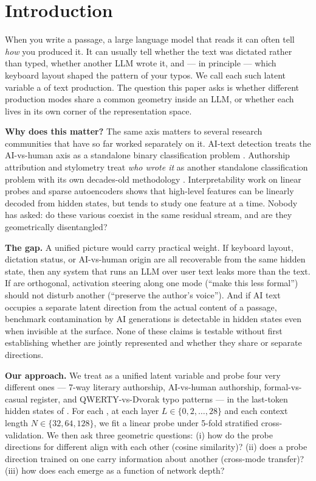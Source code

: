 \section{Introduction}
\label{sec:intro}

When you write a passage, a large language model that reads it can often tell \emph{how} you produced it. It can usually tell whether the text was dictated rather than typed, whether another LLM wrote it, and --- in principle --- which keyboard layout shaped the pattern of your typos. We call each such latent variable a \modes of text production. The question this paper asks is whether different production modes share a common geometry inside an LLM, or whether each lives in its own corner of the representation space.

{\bf Why does this matter?} The same axis matters to several research communities that have so far worked separately on it. AI-text detection treats the AI-vs-human axis as a standalone binary classification problem \citep{mitchell2023detectgpt,verma2023ghostbuster,schafer2025stylistic}. Authorship attribution and stylometry treat \emph{who wrote it} as another standalone classification problem with its own decades-old methodology \citep{rivera2021universal,sarfati2025prompt}. Interpretability work on linear probes and sparse autoencoders \citep{alain2016linear,templeton2024scaling} shows that high-level features can be linearly decoded from hidden states, but tends to study one feature at a time. Nobody has asked: do these various \modes coexist in the same residual stream, and are they geometrically disentangled?

{\bf The gap.} A unified picture would carry practical weight. If keyboard layout, dictation status, or AI-vs-human origin are all recoverable from the same hidden state, then any system that runs an LLM over user text leaks more than the text. If \modes are orthogonal, activation steering along one mode (\eg ``make this less formal'') should not disturb another (``preserve the author's voice''). And if AI text occupies a separate latent direction from the actual content of a passage, benchmark contamination by AI generations is detectable in hidden states even when invisible at the surface. None of these claims is testable without first establishing whether \modes are jointly represented and whether they share or separate directions.

{\bf Our approach.} We treat \modes as a unified latent variable and probe four very different ones --- 7-way literary authorship, AI-vs-human authorship, formal-vs-casual register, and QWERTY-vs-Dvorak typo patterns --- in the last-token hidden states of \qwen. For each \modes, at each layer $L \in \{0, 2, \ldots, 28\}$ and each context length $N \in \{32, 64, 128\}$, we fit a linear probe under 5-fold stratified cross-validation. We then ask three geometric questions: (i) how do the probe directions for different \modes align with each other (cosine similarity)? (ii) does a probe direction trained on one \modes carry information about another (cross-mode transfer)? (iii) how does each \modes emerge as a function of network depth?

